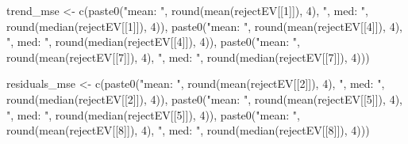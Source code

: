 \documentclass[
]{article}
\newenvironment{Shaded}{\begin{snugshade}}{\end{snugshade}}
\newcommand{\DecValTok}[1]{\textcolor[rgb]{0.00,0.00,0.81}{#1}}
\newcommand{\FunctionTok}[1]{\textcolor[rgb]{0.00,0.00,0.00}{#1}}
\newcommand{\NormalTok}[1]{#1}
\newcommand{\OtherTok}[1]{\textcolor[rgb]{0.56,0.35,0.01}{#1}}
\newcommand{\StringTok}[1]{\textcolor[rgb]{0.31,0.60,0.02}{#1}}
\begin{document}
\begin{Shaded}
\begin{Highlighting}[]
\NormalTok{  trend\_mse }\OtherTok{\textless{}{-}} \FunctionTok{c}\NormalTok{(}\FunctionTok{paste0}\NormalTok{(}\StringTok{"mean: "}\NormalTok{, }\FunctionTok{round}\NormalTok{(}\FunctionTok{mean}\NormalTok{(rejectEV[[}\DecValTok{1}\NormalTok{]]), }\DecValTok{4}\NormalTok{), }\StringTok{", med: "}\NormalTok{, }\FunctionTok{round}\NormalTok{(}\FunctionTok{median}\NormalTok{(rejectEV[[}\DecValTok{1}\NormalTok{]]), }\DecValTok{4}\NormalTok{)),}
                 \FunctionTok{paste0}\NormalTok{(}\StringTok{"mean: "}\NormalTok{, }\FunctionTok{round}\NormalTok{(}\FunctionTok{mean}\NormalTok{(rejectEV[[}\DecValTok{4}\NormalTok{]]), }\DecValTok{4}\NormalTok{), }\StringTok{", med: "}\NormalTok{, }\FunctionTok{round}\NormalTok{(}\FunctionTok{median}\NormalTok{(rejectEV[[}\DecValTok{4}\NormalTok{]]), }\DecValTok{4}\NormalTok{)),}
                 \FunctionTok{paste0}\NormalTok{(}\StringTok{"mean: "}\NormalTok{, }\FunctionTok{round}\NormalTok{(}\FunctionTok{mean}\NormalTok{(rejectEV[[}\DecValTok{7}\NormalTok{]]), }\DecValTok{4}\NormalTok{), }\StringTok{", med: "}\NormalTok{, }\FunctionTok{round}\NormalTok{(}\FunctionTok{median}\NormalTok{(rejectEV[[}\DecValTok{7}\NormalTok{]]), }\DecValTok{4}\NormalTok{)))}
  
\NormalTok{  residuals\_mse }\OtherTok{\textless{}{-}} \FunctionTok{c}\NormalTok{(}\FunctionTok{paste0}\NormalTok{(}\StringTok{"mean: "}\NormalTok{, }\FunctionTok{round}\NormalTok{(}\FunctionTok{mean}\NormalTok{(rejectEV[[}\DecValTok{2}\NormalTok{]]), }\DecValTok{4}\NormalTok{), }\StringTok{", med: "}\NormalTok{, }\FunctionTok{round}\NormalTok{(}\FunctionTok{median}\NormalTok{(rejectEV[[}\DecValTok{2}\NormalTok{]]), }\DecValTok{4}\NormalTok{)),}
                     \FunctionTok{paste0}\NormalTok{(}\StringTok{"mean: "}\NormalTok{, }\FunctionTok{round}\NormalTok{(}\FunctionTok{mean}\NormalTok{(rejectEV[[}\DecValTok{5}\NormalTok{]]), }\DecValTok{4}\NormalTok{), }\StringTok{", med: "}\NormalTok{, }\FunctionTok{round}\NormalTok{(}\FunctionTok{median}\NormalTok{(rejectEV[[}\DecValTok{5}\NormalTok{]]), }\DecValTok{4}\NormalTok{)),}
                     \FunctionTok{paste0}\NormalTok{(}\StringTok{"mean: "}\NormalTok{, }\FunctionTok{round}\NormalTok{(}\FunctionTok{mean}\NormalTok{(rejectEV[[}\DecValTok{8}\NormalTok{]]), }\DecValTok{4}\NormalTok{), }\StringTok{", med: "}\NormalTok{, }\FunctionTok{round}\NormalTok{(}\FunctionTok{median}\NormalTok{(rejectEV[[}\DecValTok{8}\NormalTok{]]), }\DecValTok{4}\NormalTok{)))}
  

\end{Highlighting}
\end{Shaded}
\end{document}
